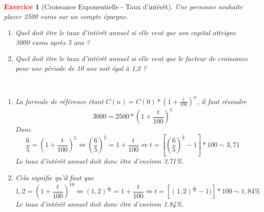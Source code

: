 \documentclass[11pt]{article}
\theoremstyle{mythmstyle}
\newtheorem{exo}{\textcolor{red}{\textbf{Exercice}}}
\begin{document}
\begin{exo}[Croissance Exponentielle - Taux d'intérêt]
\label{exp4-croissance}
Une personne souhaite placer 2500 euros sur un compte épargne.
\begin{enumerate}
    \item Quel doit être le taux d’intérêt annuel si elle veut que son capital atteigne 3000 euros après 5 ans ?
    \item Quel doit être le taux d’intérêt annuel si elle veut que le facteur de croissance pour une période de 10 ans soit égal à 1,2 ?
\end{enumerate}

\begin{solution}[\ref{exp4-croissance}]
 \label{exp4-croissance-sol}
 \hfill \\
 \begin{enumerate}
     \item La formule de référence étant $C(n)=C(0)\ast (1+\frac{t}{100})^n$, il faut résoudre
     $$
     3000= 2500\ast (1+\frac{t}{100})^5
     $$
     Donc
     $$
     \frac{6}{5}=(1+\frac{t}{100})^5\Leftrightarrow (\frac{6}{5})^{\frac{1}{5}}= 1+ \frac{t}{100} \Leftrightarrow t=[(\frac{6}{5})^{\frac{1}{5}}-1]\ast 100\sim 3,71
     $$
     Le taux d'intérêt annuel doit donc être d'environ 3,71\%.
     \item Cela signifie qu'il faut que 
     $$
     1,2= (1+ \frac{t}{100})^{10}\Leftrightarrow (1,2)^{\frac{1}{10}}= 1+ \frac{t}{100} \Leftrightarrow t= [(1,2)^{\frac{1}{10}}-1)]\ast 100\sim 1,84\%
     $$
     Le taux d'intérêt annuel doit donc être d'environ 1.84\%.
 \end{enumerate}
\end{solution}

\end{exo}
\end{document}
